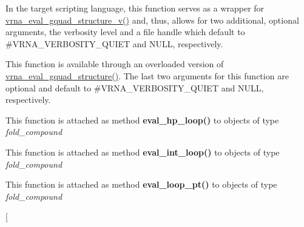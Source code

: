 \begin{DoxyRefList}
\item[\label{wrappers__wrappers000037}%
\Hypertarget{wrappers__wrappers000037}%
Global \hyperlink{group__eval_ga3263504825ef4b523eba797c99921df4}{vrna\+\_\+eval\+\_\+gquad\+\_\+structure} (const char $\ast$string, const char $\ast$structure)]In the target scripting language, this function serves as a wrapper for \hyperlink{group__eval_gaeaa2bdbc1b5d78c667e735fbdff87fff}{vrna\+\_\+eval\+\_\+gquad\+\_\+structure\+\_\+v()} and, thus, allows for two additional, optional arguments, the verbosity level and a file handle which default to \#\+V\+R\+N\+A\+\_\+\+V\+E\+R\+B\+O\+S\+I\+T\+Y\+\_\+\+Q\+U\+I\+ET and N\+U\+LL, respectively.  
\item[\label{wrappers__wrappers000047}%
\Hypertarget{wrappers__wrappers000047}%
Global \hyperlink{group__eval_gaeaa2bdbc1b5d78c667e735fbdff87fff}{vrna\+\_\+eval\+\_\+gquad\+\_\+structure\+\_\+v} (const char $\ast$string, const char $\ast$structure, int verbosity\+\_\+level, F\+I\+LE $\ast$file)]This function is available through an overloaded version of \hyperlink{group__eval_ga3263504825ef4b523eba797c99921df4}{vrna\+\_\+eval\+\_\+gquad\+\_\+structure()}. The last two arguments for this function are optional and default to \#\+V\+R\+N\+A\+\_\+\+V\+E\+R\+B\+O\+S\+I\+T\+Y\+\_\+\+Q\+U\+I\+ET and N\+U\+LL, respectively.  
\item[\label{wrappers__wrappers000033}%
\Hypertarget{wrappers__wrappers000033}%
Global \hyperlink{group__loops_gab3eb4651dc26dc2b653a57dd340d7e68}{vrna\+\_\+eval\+\_\+hp\+\_\+loop} (vrna\+\_\+fold\+\_\+compound\+\_\+t $\ast$vc, int i, int j)]This function is attached as method {\bfseries eval\+\_\+hp\+\_\+loop()} to objects of type {\itshape fold\+\_\+compound}  
\item[\label{wrappers__wrappers000034}%
\Hypertarget{wrappers__wrappers000034}%
Global \hyperlink{group__loops_ga018f1314dbbae42fdd27c94670b61721}{vrna\+\_\+eval\+\_\+int\+\_\+loop} (vrna\+\_\+fold\+\_\+compound\+\_\+t $\ast$vc, int i, int j, int k, int l)]This function is attached as method {\bfseries eval\+\_\+int\+\_\+loop()} to objects of type {\itshape fold\+\_\+compound}  
\item[\label{wrappers__wrappers000030}%
\Hypertarget{wrappers__wrappers000030}%
Global \hyperlink{group__eval_ga730ba4df55c02fd530a0cddd49faf760}{vrna\+\_\+eval\+\_\+loop\+\_\+pt} (vrna\+\_\+fold\+\_\+compound\+\_\+t $\ast$vc, int i, const short $\ast$pt)]This function is attached as method {\bfseries eval\+\_\+loop\+\_\+pt()} to objects of type {\itshape fold\+\_\+compound}  
\item[\label{wrappers__wrappers000031}%

\end{DoxyRefList}
